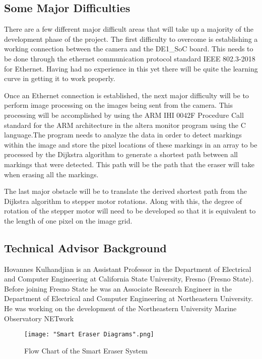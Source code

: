 \subsection{Some Major Difficulties}
There are a few different major difficult areas that will take up a majority of the development phase of the project. The first difficulty to overcome is establishing a working connection between the camera and the DE1\_SoC board. This needs to be done through the ethernet communication protocol standard IEEE 802.3-2018 for Ethernet. Having had no experience in this yet there will be quite the learning curve in getting it to work properly.\par
\setlength{\parindent}{2.5ex}
Once an Ethernet connection is established, the next major difficulty will be to perform image processing on the images being sent from the camera. This processing will be accomplished by using the ARM IHI 0042F Procedure Call standard for the ARM architecture in the altera monitor program using the C language.The program needs to analyze the data in order to detect markings within the image and store the pixel locations of these markings in an array to be processed by the Dijkstra algorithm to generate a shortest path between all markings that were detected. This path will be the path that the eraser will take when erasing all the markings.\par
\setlength{\parindent}{2.5ex}
The last major obstacle will be to translate the derived shortest path from the Dijkstra algorithm to stepper motor rotations. Along with this, the degree of rotation of the stepper motor will need to be developed so that it is equivalent to the length of one pixel on the image grid.

\subsection{Technical Advisor Background}	
Hovannes Kulhandjian is an Assistant Professor in the Department of Electrical and Computer Engineering at California State University, Fresno (Fresno State). Before joining Fresno State he was an Associate Research Engineer in the Department of Electrical and Computer Engineering at Northeastern University. He was working on the development of the Northeastern University Marine Observatory NETwork
\begin{figure}[h!]
	\centering
	{\texttt{[image: "Smart Eraser Diagrams".png]}}
	\caption{Flow Chart of the Smart Eraser System}
	\label{fig:FC1}
\end{figure}

